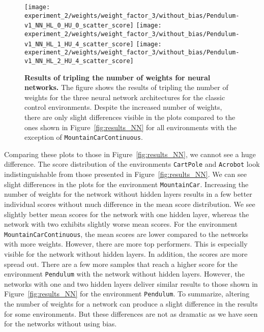 \begin{figure}[!ht]
\begin{figrow}
{\texttt{[image: experiment\_2/weights/weight\_factor\_3/without\_bias/Pendulum-v1\_NN\_HL\_0\_HU\_0\_scatter\_score]}
\texttt{[image: experiment\_2/weights/weight\_factor\_3/without\_bias/Pendulum-v1\_NN\_HL\_1\_HU\_4\_scatter\_score]}
\texttt{[image: experiment\_2/weights/weight\_factor\_3/without\_bias/Pendulum-v1\_NN\_HL\_2\_HU\_4\_scatter\_score]}}
\end{figrow}
\vspace*{-5mm}
\caption[Results of tripling the number of weights for neural networks]{
  \textbf{Results of tripling the number of weights for neural networks.}
   The figure shows the results of tripling the number of weights for the three neural network architectures for the classic control environments. Despite the increased number of weights, there are only slight differences visible in the plots compared to the ones shown in Figure~\ref{fig:results_NN} for all environments with the exception of \texttt{MountainCarContinuous}.
}
\label{fig:results_NN_weights}
\end{figure}
Comparing these plots to those in Figure~\ref{fig:results_NN}, we cannot see a huge difference. The score distribution of the environments \verb|CartPole| and \verb|Acrobot| look indistinguishable from those presented in Figure~\ref{fig:results_NN}. We can see slight differences in the plots for the environment \verb|MountainCar|. Increasing the number of weights for the network without hidden layers results in a few better individual scores without much difference in the mean score distribution. We see slightly better mean scores for the network with one hidden layer, whereas the network with two exhibits slightly worse mean scores. For the environment \verb|MountainCarContinuous|, the mean scores are lower compared to the networks with more weights. However, there are more top performers.  This is especially visible for the network without hidden layers. In addition, the scores are more spread out. There are a few more samples that reach a higher score for the environment \verb|Pendulum| with the network without hidden layers. However, the networks with one and two hidden layers deliver similar results to those shown in Figure~\ref{fig:results_NN} for the environment \verb|Pendulum|. To summarize, altering the number of weights for a network can produce a slight difference in the results for some environments. But these differences are not as dramatic as we have seen for the networks without using bias.

